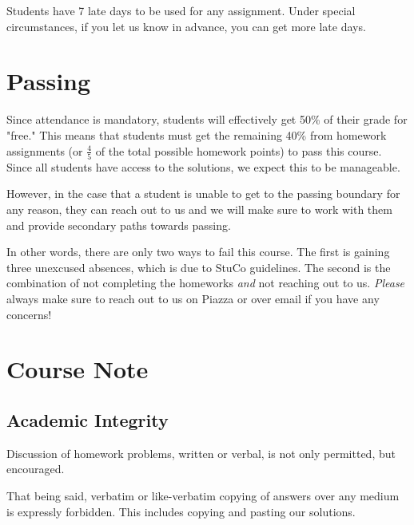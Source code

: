 \documentclass{article}
\begin{document}
Students have 7 late days to be used for any assignment. Under special
circumstances, if you let us know in advance, you can get more late days.


\section*{Passing}

Since attendance is mandatory, students will effectively get 50\% of their grade
for "free." This means that students must get the remaining 40\% from homework
assignments (or $\frac{4}{5}$ of the total possible homework points) to pass
this course. Since all students have access to the solutions, we expect this to
be manageable.

However, in the case that a student is unable to get to the passing boundary
for any reason, they can reach out to us and we will make sure to work with
them and provide secondary paths towards passing.

In other words, there are only two ways to fail this course. The first is
gaining three unexcused absences, which is due to StuCo guidelines. The second
is the combination of not completing the homeworks \textit{and} not reaching
out to us. \textit{Please} always make sure to reach out to us on Piazza or
over email if you have any concerns!


\clearpage


\section*{Course Note}

\subsection*{Academic Integrity}

Discussion of homework problems, written or verbal, is not only permitted, but 
encouraged.

That being said, verbatim or like-verbatim copying of answers over any medium 
is expressly forbidden. This includes copying and pasting our solutions.
\end{document}
